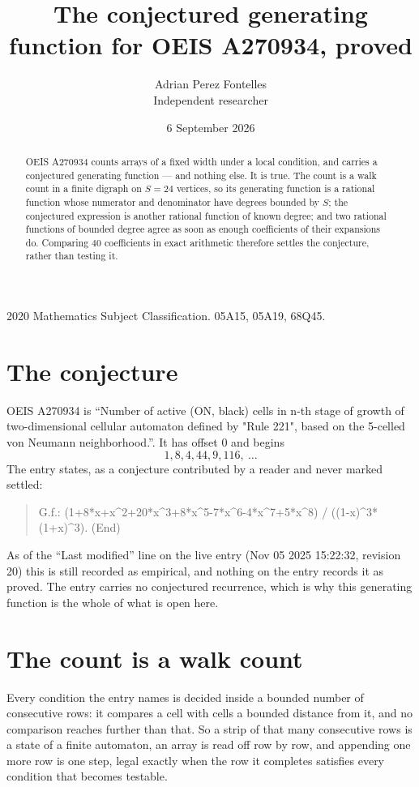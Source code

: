 \documentclass[11pt,a4paper]{article}
\title{The conjectured generating function for OEIS A270934, proved}
\author{Adrian Perez Fontelles\\ \small Independent researcher}
\date{6 September 2026}
\theoremstyle{plain}
\theoremstyle{definition}
\begin{document}
\maketitle

\begin{abstract}
OEIS A270934 counts arrays of a fixed width under a local condition, and carries a conjectured
generating function --- and nothing else. It is true. The count is a walk count in a finite
digraph on $S=24$ vertices, so its generating function is a rational function whose numerator
and denominator have degrees bounded by $S$; the conjectured expression is another rational
function of known degree; and two rational functions of bounded degree agree as soon as enough
coefficients of their expansions do. Comparing $40$ coefficients in exact arithmetic
therefore settles the conjecture, rather than testing it.
\end{abstract}

\noindent\small 2020 Mathematics Subject Classification. 05A15, 05A19, 68Q45.\normalsize

\section{The conjecture}

OEIS A270934 is ``Number of active (ON, black) cells in n-th stage of growth of two-dimensional cellular automaton defined by "Rule 221", based on the 5-celled von Neumann neighborhood.''. It has offset $0$ and begins
\[
1, 8, 4, 44, 9, 116,\ \dots
\]
The entry states, as a conjecture contributed by a reader and never marked settled:
\begin{quote}
G.f.: (1+8*x+x\^{}2+20*x\^{}3+8*x\^{}5-7*x\^{}6-4*x\^{}7+5*x\^{}8) / ((1-x)\^{}3*(1+x)\^{}3). (End)
\end{quote}
As of the ``Last modified'' line on the live entry (Nov 05 2025 15:22:32, revision 20) this is still
recorded as empirical, and nothing on the entry records it as proved. The entry carries no
conjectured recurrence, which is why this generating function is the whole of what is open
here.

\section{The count is a walk count}

Every condition the entry names is decided inside a bounded number of consecutive rows: it
compares a cell with cells a bounded distance from it, and no comparison reaches further than
that. So a strip of that many consecutive rows is a state of a finite automaton, an array is
read off row by row, and appending one more row is one step, legal exactly when the row it
completes satisfies every condition that becomes testable.
\end{document}
